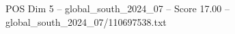 \begin{textsample}{POS Dim 5 – global\_south\_2024\_07 – Score 17.00 – global\_south\_2024\_07/110697538.txt}
\end{textsample}
